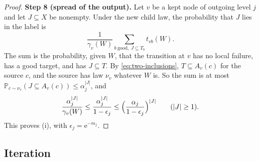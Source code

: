 \documentclass[11pt]{article}
\numberwithin{equation}{section}
\newcommand{\PP}{\mathbb P}
\newcommand{\ee}{\mathrm e}
\newcommand{\Step}[1]{\par\smallskip\noindent\textbf{Step #1.}}
\begin{document}
\begin{proof}
\Step{8 (spread of the output)} Let $v$ be a kept node of outgoing level $j$
and let $J\subseteq X$ be nonempty. Under the new child law, the probability
that $J$ lies in the label is
\[
 \frac1{\gamma_v(W)}\sum_{b\ \mathrm{good},\ J\subseteq T_b}t_{vb}(W).
\]
The sum is the probability, given $W$, that the transition at $v$ has no local
failure, has a good target, and has $J\subseteq T$. By
\eqref{eq:two-inclusions}, $T\subseteq A_v(c)$ for the source $c$, and the
source has law $\nu_v$ whatever $W$ is. So the sum is at most
$\PP_{c\sim\nu_v}(J\subseteq A_v(c))\le\alpha_j^{|J|}$, and
\[
 \frac{\alpha_j^{|J|}}{\gamma_v(W)}\le\frac{\alpha_j^{|J|}}{1-\epsilon_j}
 \le\Bigl(\frac{\alpha_j}{1-\epsilon_j}\Bigr)^{|J|}\qquad(|J|\ge1).
\]
This proves (i), with $\epsilon_j=\ee^{-m_j}$.
\end{proof}

\subsection{Iteration}
\end{document}
